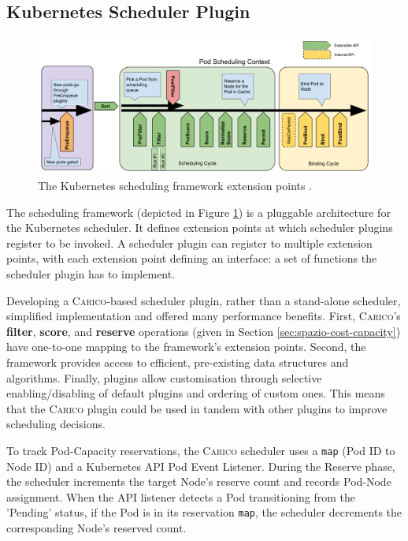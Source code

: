 \subsection{Kubernetes Scheduler Plugin}
\begin{figure}[ht!]
    \centering
    \includegraphics[width=\textwidth]{images/scheduling-framework-extensions.png}
    \caption{The Kubernetes scheduling framework extension points
    \cite{scheduling-framework}.}
    \label{fig:kube-sched-framework}
\end{figure}
The scheduling framework (depicted in Figure \ref{fig:kube-sched-framework}) is
a pluggable architecture for the Kubernetes scheduler. It defines extension
points at which scheduler plugins register to be invoked. A scheduler plugin can
register to multiple extension points, with each extension point defining an
interface: a set of functions the scheduler plugin has to implement.

Developing a \textsc{Carico}-based scheduler plugin, rather than a stand-alone
scheduler, simplified implementation and offered many performance benefits. First,
\textsc{Carico}'s \textbf{filter}, \textbf{score}, and \textbf{reserve}
operations (given in Section \ref{sec:spazio-cost-capacity}) have one-to-one
mapping to the framework's extension points. Second, the framework provides
access to efficient, pre-existing data structures and algorithms. Finally,
plugins allow customisation through selective enabling/disabling of default
plugins and ordering of custom ones. This means that the \textsc{Carico} plugin
could be used in tandem with other plugins to improve scheduling decisions.

To track Pod-Capacity reservations, the \textsc{Carico} scheduler uses a
\verb|map| (Pod ID to Node ID) and a Kubernetes API Pod Event Listener. During
the Reserve phase, the scheduler increments the target Node's reserve count and
records Pod-Node assignment. When the API listener detects a Pod transitioning
from the 'Pending' status, if the Pod is in its reservation \verb|map|, the
scheduler decrements the corresponding Node's reserved count.
